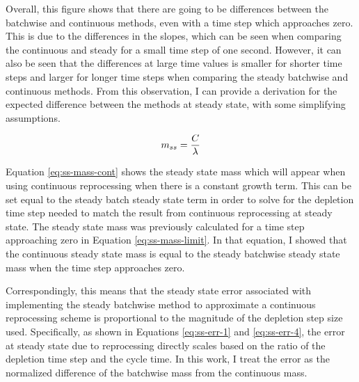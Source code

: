 Overall, this figure shows that there are going to be differences between the batchwise and continuous methods, even with a time step which approaches zero. This is due to the differences in the slopes, which can be seen when comparing the continuous and steady for a small time step of one second. However, it can also be seen that the differences at large time values is smaller for shorter time steps and larger for longer time steps when comparing the steady batchwise and continuous methods. From this observation, I can provide a derivation for the expected difference between the methods at steady state, with some simplifying assumptions.

\begin{equation} \hfill
m_{ss} = \frac{C}{\lambda}
\hfill\label{eq:ss-mass-cont} \end{equation}

Equation \eqref{eq:ss-mass-cont} shows the steady state mass which will appear when using continuous reprocessing when there is a constant growth term. This can be set equal to the steady batch steady state term in order to solve for the depletion time step needed to match the result from continuous reprocessing at steady state.
The steady state mass was previously calculated for a time step approaching zero in Equation \eqref{eq:ss-mass-limit}.
In that equation, I showed that the continuous steady state mass is equal to the steady batchwise steady state mass when the time step approaches zero.


Correspondingly, this means that the steady state error associated with implementing the steady batchwise method to approximate a continuous reprocessing scheme is proportional to the magnitude of the depletion step size used. Specifically, as shown in Equations \eqref{eq:ss-err-1} and \eqref{eq:ss-err-4}, the error at steady state due to reprocessing directly scales based on the ratio of the depletion time step and the cycle time. In this work, I treat the error as the normalized difference of the batchwise mass from the continuous mass.

